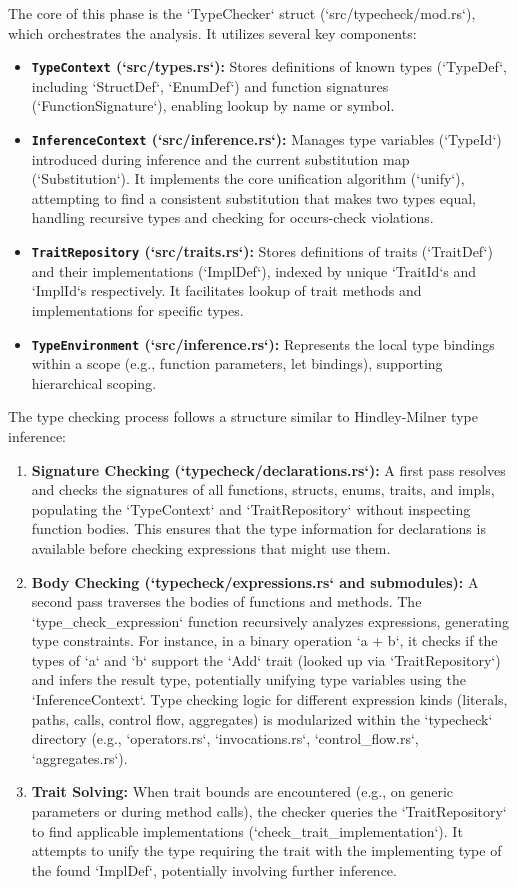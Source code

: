 The core of this phase is the `TypeChecker` struct (`src/typecheck/mod.rs`), which orchestrates the analysis. It utilizes several key components:
\begin{itemize}
    \item \textbf{\texttt{TypeContext} (`src/types.rs`):} Stores definitions of known types (`TypeDef`, including `StructDef`, `EnumDef`) and function signatures (`FunctionSignature`), enabling lookup by name or symbol.
    \item \textbf{\texttt{InferenceContext} (`src/inference.rs`):} Manages type variables (`TypeId`) introduced during inference and the current substitution map (`Substitution`). It implements the core unification algorithm (`unify`), attempting to find a consistent substitution that makes two types equal, handling recursive types and checking for occurs-check violations.
    \item \textbf{\texttt{TraitRepository} (`src/traits.rs`):} Stores definitions of traits (`TraitDef`) and their implementations (`ImplDef`), indexed by unique `TraitId`s and `ImplId`s respectively. It facilitates lookup of trait methods and implementations for specific types.
    \item \textbf{\texttt{TypeEnvironment} (`src/inference.rs`):} Represents the local type bindings within a scope (e.g., function parameters, let bindings), supporting hierarchical scoping.
\end{itemize}

The type checking process follows a structure similar to Hindley-Milner type inference:
\begin{enumerate}
    \item \textbf{Signature Checking (`typecheck/declarations.rs`):} A first pass resolves and checks the signatures of all functions, structs, enums, traits, and impls, populating the `TypeContext` and `TraitRepository` without inspecting function bodies. This ensures that the type information for declarations is available before checking expressions that might use them.
    \item \textbf{Body Checking (`typecheck/expressions.rs` and submodules):} A second pass traverses the bodies of functions and methods. The `type\_check\_expression` function recursively analyzes expressions, generating type constraints. For instance, in a binary operation `a + b`, it checks if the types of `a` and `b` support the `Add` trait (looked up via `TraitRepository`) and infers the result type, potentially unifying type variables using the `InferenceContext`. Type checking logic for different expression kinds (literals, paths, calls, control flow, aggregates) is modularized within the `typecheck` directory (e.g., `operators.rs`, `invocations.rs`, `control_flow.rs`, `aggregates.rs`).
    \item \textbf{Trait Solving:} When trait bounds are encountered (e.g., on generic parameters or during method calls), the checker queries the `TraitRepository` to find applicable implementations (`check\_trait\_implementation`). It attempts to unify the type requiring the trait with the implementing type of the found `ImplDef`, potentially involving further inference.
\end{enumerate}

